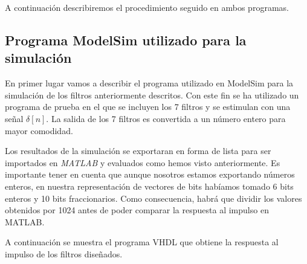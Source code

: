 \documentclass[a4paper,12pt]{report}
\begin{document}
A continuación describiremos el procedimiento seguido en ambos programas.

\subsection{Programa ModelSim utilizado para la simulación}

En primer lugar vamos a describir el programa utilizado en ModelSim para la simulación de los filtros anteriormente descritos. Con este fin se ha utilizado un programa de prueba en el que se incluyen los 7 filtros y se estimulan con una señal $\delta[n]$. La salida de los 7 filtros es convertida a un número entero para mayor comodidad.

Los resultados de la simulación se exportaran en forma de lista para ser importados en \emph{MATLAB} y evaluados como hemos visto anteriormente. Es importante tener en cuenta que aunque nosotros estamos exportando números enteros, en nuestra representación de vectores de bits habíamos tomado 6 bits enteros y 10 bits fraccionarios. Como consecuencia, habrá que dividir los valores obtenidos por 1024 antes de poder comparar la respuesta al impulso en MATLAB.

A continuación se muestra el programa VHDL que obtiene la respuesta al impulso de los filtros diseñados.
\end{document}
